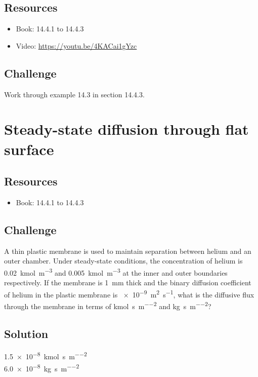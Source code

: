 \subsection*{Resources}
\begin{itemize}
    \item Book: 14.4.1 to 14.4.3
    \item Video: \url{https://youtu.be/4KACai1gYzc}
\end{itemize}

\subsection*{Challenge}
Work through example 14.3 in section 14.4.3.




\newpage
\section{Steady-state diffusion through flat surface}

\subsection*{Resources}
\begin{itemize}
    \item Book: 14.4.1 to 14.4.3
\end{itemize}

\subsection*{Challenge}
A thin plastic membrane is used to maintain separation between helium and an outer chamber. Under steady-state conditions, the concentration of helium is \SI{0.02}{\kmol\per\cubic\meter} and \SI{0.005}{\kmol\per\cubic\meter} at the inner and outer boundaries respectively. If the membrane is \SI{1}{\mm} thick and the binary diffusion coefficient of helium in the plastic membrane is \SI{e-9}{\square\meter\per\second}, what is the diffusive flux through the membrane in terms of \si{\kmol\per\second\per\square\meter} and \si{\kg\per\second\per\square\meter}?

\subsection*{Solution}
\SI{1.5e-8}{\kmol\per\second\per\square\meter}\\
\SI{6.0e-8}{\kg\per\second\per\square\meter}




